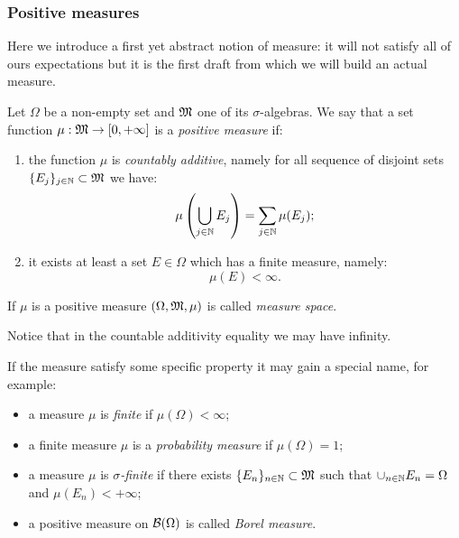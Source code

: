 \subsubsection{Positive measures}
Here we introduce a first yet abstract notion of measure: it will not satisfy all of ours expectations but it is the first draft from which we will build an actual measure. 

\begin{defn}\label{defn-positive-measure}
  Let $\Omega$ be a non-empty set and $\mathfrak M$ one of its $\sigma$-algebras. We say that a set function $\mu : \mathfrak M \to [0, + \infty]$ is a \emph{positive measure} if:
  \begin{enumerate}
    \item the function $\mu$ is \emph{countably additive}, namely for all sequence of disjoint sets $\{ E_j \}_{j \in \mathbb N} \subset \mathfrak M$  we have:
    $$
    	\mu \left( \bigcup_{j \in \mathbb N} E_j \right) 
    	= \sum_{j \in \mathbb N} \mu(E_j)
    ;
    $$
    \item it exists at least a set $E\in \Omega$ which has a finite measure, namely:
    $$
    	\mu(E) 
    	< \infty
    .
    $$
  \end{enumerate}
  If $\mu$ is a positive measure $(\Omega, \mathfrak M, \mu)$ is called \emph{measure space}.
\end{defn}

Notice that in the countable additivity equality we may have infinity.

If the measure satisfy some specific property it may gain a special name, for example:
\begin{itemize}
	\item a measure $\mu$ is \emph{finite} if $\mu(\Omega) < \infty$;
	\item a finite measure $\mu$ is a \emph{probability measure} if $\mu(\Omega) = 1$;
	\item a measure $\mu$ is \emph{$\sigma$-finite} if there exists $\{E_n\}_{n \in \mathbb N} \subset \mathfrak M$ such that $\cup_{n\in \mathbb N} E_n =\Omega$ and $\mu(E_n) < +\infty$;
	\item a positive measure on $\mathcal B(\Omega)$ is called \emph{Borel measure}.
\end{itemize}

